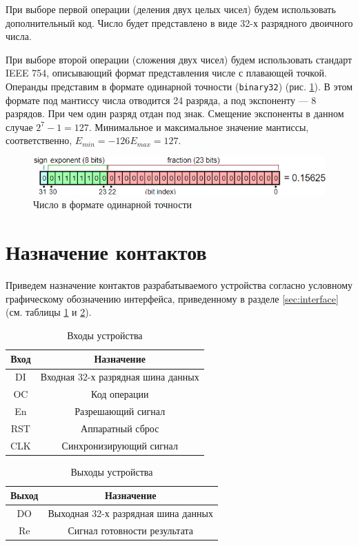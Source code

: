 \documentclass[a4paper,14pt]{extarticle}
\begin{document}
 При выборе первой операции (деления двух целых чисел) будем использовать дополнительный код. Число будет представлено в виде 32-х разрядного двоичного числа.
 
 При выборе второй операции (сложения двух чисел) будем использовать стандарт IEEE 754, описывающий формат представления числе с плавающей точкой. Операнды представим в формате одинарной точности (\texttt{binary32}) (рис. \ref{fig:coursebinary32}). В этом формате под мантиссу числа отводится 24 разряда, а под экспоненту --- 8 разрядов. При чем один разряд отдан под знак. Смещение экспоненты в данном случае $2^7-1=127$. Минимальное и максимальное значение мантиссы, соответственно, $E_{min}=-126 E_{max}=127$.
 \begin{figure}
 	\centering
 	\includegraphics[width=0.7\linewidth]{images/course_binary32}
 	\caption{Число в формате одинарной точности}
 	\label{fig:coursebinary32}
 \end{figure}
 
 
\section{Назначение контактов}
Приведем назначение контактов разрабатываемого устройства согласно условному графическому обозначению интерфейса, приведенному в разделе \ref{sec:interface} (см. таблицы \ref{tab:inputs} и \ref{tab:outputs}).
\begin{table}[h!]
	\centering
	\begin{tabular}{|c|c|}
		\hline
		\multicolumn{1}{|c|}{\textbf{Вход}} & \multicolumn{1}{c|}{\textbf{Назначение}} \\ \hline
		DI & Входная 32-х разрядная шина данных \\ \hline
		OC & Код операции \\ \hline
		En & Разрешающий сигнал \\ \hline
		RST & Аппаратный сброс \\ \hline
		CLK & Синхронизирующий сигнал \\ \hline
	\end{tabular}
	\caption{Входы устройства}
	\label{tab:inputs}

\end{table}

\begin{table}[h!]
	\centering
	\begin{tabular}{|c|c|}
		\hline
		\multicolumn{1}{|c|}{\textbf{Выход}} & \multicolumn{1}{c|}{\textbf{Назначение}} \\ \hline
		DO & Выходная 32-х разрядная шина данных \\ \hline
		Re & Сигнал готовности результата \\ \hline
	\end{tabular}
	\caption{Выходы устройства}
	\label{tab:outputs}

\end{table} 
\end{document}
